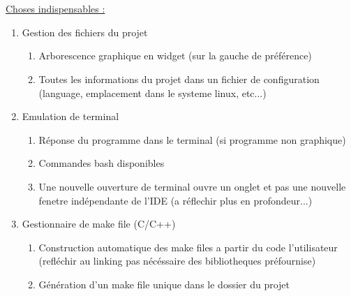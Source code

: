 \documentclass[a4paper,12pt]{article}
\author{\begin{flushleft}Eté Rémi\end{flushleft}}
\date\today
\newcommand\BackgroundPic{
\put(0,0){
\parbox[b][\paperheight]{\paperwidth}{
\vfill
\centering
\texttt{[image:    Picture!!!!!   ]}
\vfill
}}}
\begin{document}


~\\
~\\

\noindent \underline{Choses indispensables :}
~\\
\begin{enumerate}
\item Gestion des fichiers du projet

\begin{enumerate}
\item Arborescence graphique en widget (sur la gauche de préférence)
\item Toutes les informations du projet dans un fichier de configuration (language, emplacement dans le systeme linux, etc...)
\end{enumerate}

\item Emulation de terminal

\begin{enumerate}
\item Réponse du programme dans le terminal (si programme non graphique)
\item Commandes bash disponibles 
\item Une nouvelle ouverture de terminal ouvre un onglet et pas une nouvelle fenetre indépendante de l'IDE (a réflechir plus en profondeur...)
\end{enumerate}

\item Gestionnaire de make file (C/C++)

\begin{enumerate}
\item Construction automatique des make files a partir du code l'utilisateur (refléchir au linking pas nécéssaire des bibliotheques préfournise)
\item Génération d'un make file unique dans le dossier du projet 
\end{enumerate}


\end{enumerate}
\end{document}

